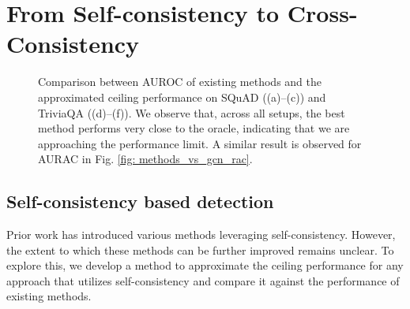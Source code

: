 \section{From Self-consistency to Cross-Consistency}
\label{sec:3}
\begin{figure*}[!t]
    \centering

\vspace{-.2cm}
    \vspace{-.2cm}
    \caption{Comparison between AUROC of existing methods and the approximated ceiling performance on SQuAD ((a)–(c)) and TriviaQA ((d)–(f)). We observe that, across all setups, the best method performs very close to the oracle, indicating that we are approaching the performance limit. A similar result is observed for AURAC in Fig. \ref{fig: methods_vs_gcn_rac}.}
    \label{fig: methods_vs_gcn_roc}
    \vspace{-.1cm}
\end{figure*}

\subsection{Self-consistency based detection}\label{subsec: approx_ceiling_self}

Prior work \cite{manakul2023selfcheckgpt,farquhar2024detecting,kuhn2023semantic,lin2023generating,nikitin2024kernel} has introduced various methods leveraging self-consistency. However, the extent to which these methods can be further improved remains unclear. To explore this, we develop a method to approximate the ceiling performance for any approach that utilizes self-consistency and compare it against the performance of existing methods.


